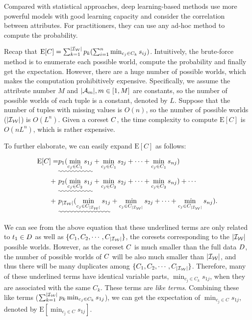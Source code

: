 Compared with statistical approaches, deep learning-based methods use more powerful models with good learning capacity and consider the correlation between attributes. For practitioners, they can use any ad-hoc method to compute the probability.



 Recap that $\mathrm{E}[C] = \sum_{k= 1}^{|\mathcal{I_W}|} p_k (\sum_{i=1}^n \min_{c_j\in C_k}s_{ij})$. Intuitively, the brute-force method is to enumerate each possible world, compute the probability and finally get the expectation. However, there are a huge number of possible worlds, which makes the  computation prohibitively expensive. Specifically, we assume the attribute number $M$ and $|\mathcal{A}_m|, m\in [1, M]$ are  constants, so the number of possible worlds of each tuple is a constant, denoted by $L$.
Suppose that the number of tuples with missing values is $O(n)$, so the number of possible worlds ($|\mathcal{I_W}|$) is $O(L^n)$. Given a coreset $C$, the time complexity to compute $\mathrm{E}[C]$ is $O(nL^n)$, which is rather expensive.

 To further elaborate, we can easily expand $\mathrm{E}[C]$ as follows:


\begin{equation*}
\begin{aligned}
	\mathrm{E}[C] =& \uwave{p_1(\min_{c_j\in C_1}s_{1j}} + \min_{c_j\in C_1}s_{2j} + \cdots + \min_{c_j\in C_1}s_{nj})\\
	+ ~& \uwave{p_2(\min_{c_j\in C_2}s_{1j}} + \min_{c_j\in C_2}s_{2j} + \cdots + \min_{c_j\in C_2}s_{nj})+ \cdots \\
	+ ~& \uwave{p_{|\worlds|}(\min_{c_j\in C_{|\worlds|}}s_{1j}} + \min_{c_j\in C_{|\worlds|}}s_{2j} + \cdots + \min_{c_j\in C_{|\worlds|}}s_{nj}).
\end{aligned}
\end{equation*}

\noindent  We can see from the above equation that these underlined terms are only related to $t_1\in D$ as well as  $\{C_1, C_2, \cdots, C_{|\mathcal{I_W}|}\}$, \ie the coresets corresponding to the $|\mathcal{I_W}|$  possible worlds.
However, as the coreset $C$ is much smaller than the full data $D$, the number of possible worlds of $C$ will be also much smaller than $|\mathcal{I_W}|$, and thus there will be many duplicates among $\{C_1, C_2, \cdots, C_{|\mathcal{I_W}|}\}$.
Therefore, many of these underlined terms  have identical variable parts, \ie $\min_{c_j\in C_k} s_{1j}$, when they are associated with the same  $C_k$. These terms are \textit{like terms}. Combining these like terms  (\ie $\sum_{k=1}^{|\mathcal{I_W}|} p_k \min_{c_j\in C_k}s_{1j}$), we can get the expectation of $\min_{c_j\in C}s_{1j}$, denoted by $\mathrm{E}[\min_{c_j\in C}s_{1j}]$.




